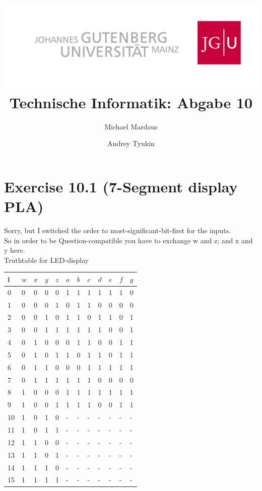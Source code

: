\documentclass[10pt,a4paper]{scrartcl}
\author{Michael Mardaus \and Andrey Tyukin}
\title{\includegraphics[scale=0.2]{../logo_schriftzug}\\
Technische Informatik: Abgabe 10}
\begin{document}
\maketitle

\section*{Exercise 10.1 (7-Segment display PLA)}

Sorry, but I switched the order to most-significant-bit-first for the inputs.\\
So in order to be Question-compatible you have to exchange w and z; and x and y here.\\

Truthtable for LED-display\\
\begin{tabular}{|l||l|l|l|l||l|l|l|l|l|l|l|}\hline
i  & $w$ & $x$ & $y$ & $z$ &     $a$ & $b$ & $c$ & $d$ & $e$ & $f$ & $g$ \\\hline\hline
0  & 0   & 0   & 0   & 0   &      1  &  1  &  1  &  1  &  1  &  1  &  0  \\\hline
1  & 0   & 0   & 0   & 1   &      0  &  1  &  1  &  0  &  0  &  0  &  0  \\\hline
2  & 0   & 0   & 1   & 0   &      1  &  1  &  0  &  1  &  1  &  0  &  1  \\\hline
3  & 0   & 0   & 1   & 1   &      1  &  1  &  1  &  1  &  0  &  0  &  1  \\\hline
4  & 0   & 1   & 0   & 0   &      0  &  1  &  1  &  0  &  0  &  1  &  1  \\\hline
5  & 0   & 1   & 0   & 1   &      1  &  0  &  1  &  1  &  0  &  1  &  1  \\\hline
6  & 0   & 1   & 1   & 0   &      0  &  0  &  1  &  1  &  1  &  1  &  1  \\\hline
7  & 0   & 1   & 1   & 1   &      1  &  1  &  1  &  0  &  0  &  0  &  0  \\\hline
8  & 1   & 0   & 0   & 0   &      1  &  1  &  1  &  1  &  1  &  1  &  1  \\\hline
9  & 1   & 0   & 0   & 1   &      1  &  1  &  1  &  0  &  0  &  1  &  1  \\\hline
10 & 1   & 0   & 1   & 0   &      -  &  -  &  -  &  -  &  -  &  -  &  -  \\\hline
11 & 1   & 0   & 1   & 1   &      -  &  -  &  -  &  -  &  -  &  -  &  -  \\\hline
12 & 1   & 1   & 0   & 0   &      -  &  -  &  -  &  -  &  -  &  -  &  -  \\\hline
13 & 1   & 1   & 0   & 1   &      -  &  -  &  -  &  -  &  -  &  -  &  -  \\\hline
14 & 1   & 1   & 1   & 0   &      -  &  -  &  -  &  -  &  -  &  -  &  -  \\\hline
15 & 1   & 1   & 1   & 1   &      -  &  -  &  -  &  -  &  -  &  -  &  -  \\\hline
\end{tabular}
\end{document}
